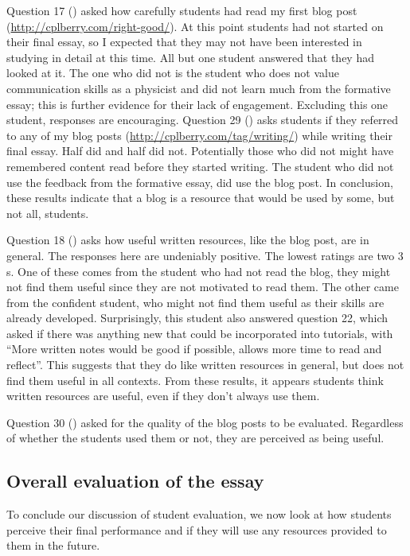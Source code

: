 Question 17 () asked how carefully students had read my first blog post (\url{http://cplberry.com/right-good/}). At this point students had not started on their final essay, so I expected that they may not have been interested in studying in detail at this time. All but one student answered that they had looked at it. The one who did not is the student who does not value communication skills as a physicist and did not learn much from the formative essay; this is further evidence for their lack of engagement. Excluding this one student, responses are encouraging. Question 29 () asks students if they referred to any of my blog posts (\url{http://cplberry.com/tag/writing/}) while writing their final essay. Half did and half did not. Potentially those who did not might have remembered content read before they started writing. The student who did not use the feedback from the formative essay, did use the blog post. In conclusion, these results indicate that a blog is a resource that would be used by some, but not all, students.

Question 18 () asks how useful written resources, like the blog post, are in general. The responses here are undeniably positive. The lowest ratings are two $3$s. One of these comes from the student who had not read the blog, they might not find them useful since they are not motivated to read them. The other came from the confident student, who might not find them useful as their skills are already developed. Surprisingly, this student also answered question 22, which asked if there was anything new that could be incorporated into tutorials, with ``More written notes would be good if possible, allows more time to read and reflect''. This suggests that they do like written resources in general, but does not find them useful in all contexts. From these results, it appears students think written resources are useful, even if they don't always use them.

Question 30 () asked for the quality of the blog posts to be evaluated. Regardless of whether the students used them or not, they are perceived as being useful.

\subsection{Overall evaluation of the essay}\label{sec:views-essay}

To conclude our discussion of student evaluation, we now look at how students perceive their final performance and if they will use any resources provided to them in the future.

